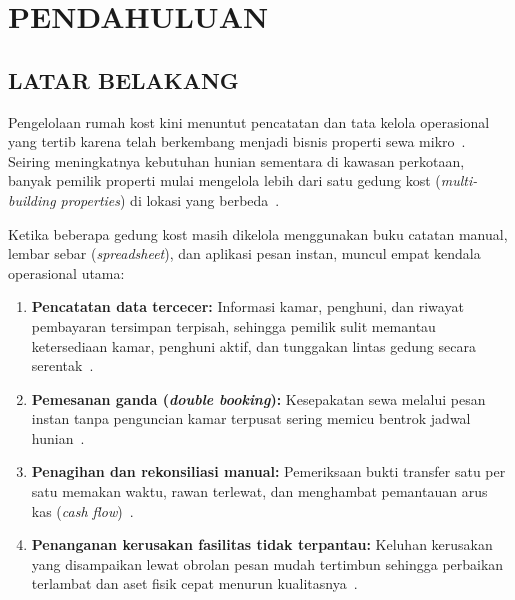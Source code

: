 \chapter{PENDAHULUAN}

\section{LATAR BELAKANG}

Pengelolaan rumah kost kini menuntut pencatatan dan tata kelola operasional yang tertib karena telah berkembang menjadi bisnis properti sewa mikro~\cite{tjahjanto2025}. Seiring meningkatnya kebutuhan hunian sementara di kawasan perkotaan, banyak pemilik properti mulai mengelola lebih dari satu gedung kost (\textit{multi-building properties}) di lokasi yang berbeda~\cite{wahyuni2025}.

Ketika beberapa gedung kost masih dikelola menggunakan buku catatan manual, lembar sebar (\textit{spreadsheet}), dan aplikasi pesan instan, muncul empat kendala operasional utama:
\begin{enumerate}[label=\arabic*., leftmargin=*]
  \item \textbf{Pencatatan data tercecer:} Informasi kamar, penghuni, dan riwayat pembayaran tersimpan terpisah, sehingga pemilik sulit memantau ketersediaan kamar, penghuni aktif, dan tunggakan lintas gedung secara serentak~\cite{tjahjanto2025}.
  \item \textbf{Pemesanan ganda (\textit{double booking}):} Kesepakatan sewa melalui pesan instan tanpa penguncian kamar terpusat sering memicu bentrok jadwal hunian~\cite{jati2025}.
  \item \textbf{Penagihan dan rekonsiliasi manual:} Pemeriksaan bukti transfer satu per satu memakan waktu, rawan terlewat, dan menghambat pemantauan arus kas (\textit{cash flow})~\cite{ayyubi2024}.
  \item \textbf{Penanganan kerusakan fasilitas tidak terpantau:} Keluhan kerusakan yang disampaikan lewat obrolan pesan mudah tertimbun sehingga perbaikan terlambat dan aset fisik cepat menurun kualitasnya~\cite{ayyubi2024}.
\end{enumerate}

